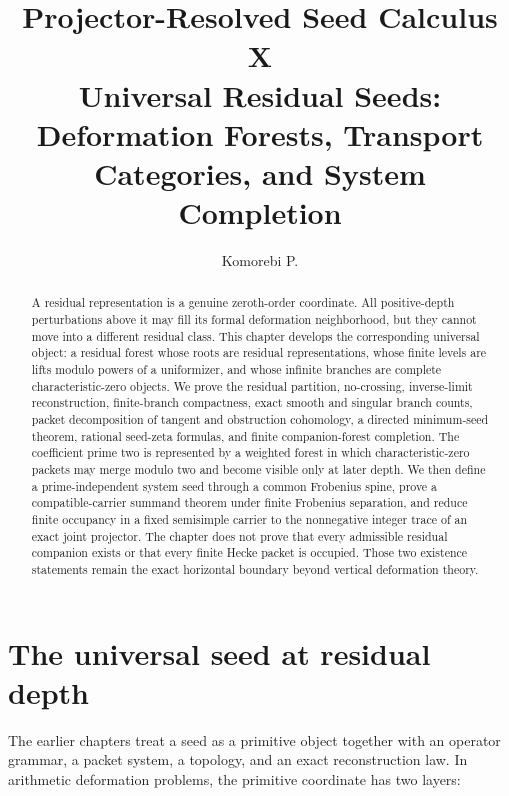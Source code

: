 \documentclass[11pt]{article}
\title{\textbf{Projector-Resolved Seed Calculus X}\\[0.35em]
\large Universal Residual Seeds: Deformation Forests, Transport Categories, and System Completion}
\author{Komorebi P.}
\date{}
\theoremstyle{definition}
\theoremstyle{remark}
\begin{document}
\KomorebiCover
{}



\begin{abstract}
A residual representation is a genuine zeroth-order coordinate.  All positive-depth perturbations above it may fill its formal deformation neighborhood, but they cannot move into a different residual class.  This chapter develops the corresponding universal object: a residual forest whose roots are residual representations, whose finite levels are lifts modulo powers of a uniformizer, and whose infinite branches are complete characteristic-zero objects.  We prove the residual partition, no-crossing, inverse-limit reconstruction, finite-branch compactness, exact smooth and singular branch counts, packet decomposition of tangent and obstruction cohomology, a directed minimum-seed theorem, rational seed-zeta formulas, and finite companion-forest completion.  The coefficient prime two is represented by a weighted forest in which characteristic-zero packets may merge modulo two and become visible only at later depth.  We then define a prime-independent system seed through a common Frobenius spine, prove a compatible-carrier summand theorem under finite Frobenius separation, and reduce finite occupancy in a fixed semisimple carrier to the nonnegative integer trace of an exact joint projector.  The chapter does not prove that every admissible residual companion exists or that every finite Hecke packet is occupied.  Those two existence statements remain the exact horizontal boundary beyond vertical deformation theory.
\end{abstract}


\clearpage
\tableofcontents
\newpage

\section{The universal seed at residual depth}

The earlier chapters treat a seed as a primitive object together with an operator grammar, a packet system, a topology, and an exact reconstruction law.  In arithmetic deformation problems, the primitive coordinate has two layers:
\end{document}
